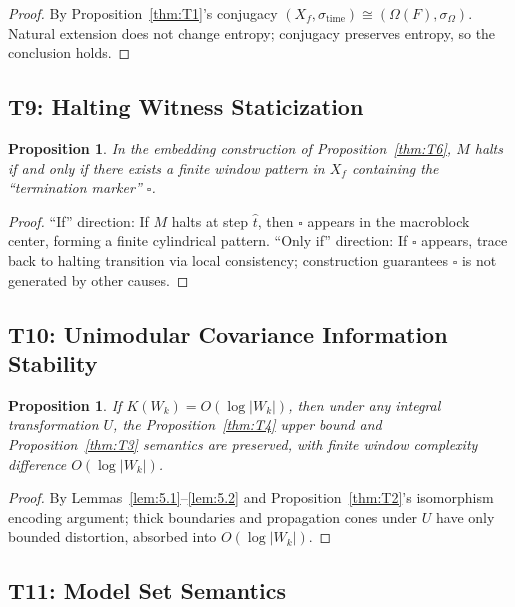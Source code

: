 \documentclass[11pt]{article}
\newtheorem{proposition}[theorem]{Proposition}
\theoremstyle{definition}
\theoremstyle{remark}
\begin{document}
\begin{proof}
By Proposition~\ref{thm:T1}'s conjugacy \( (X_f, \sigma_{\mathrm{time}}) \cong (\Omega(F), \sigma_\Omega) \). Natural extension does not change entropy; conjugacy preserves entropy, so the conclusion holds.
\end{proof}

\subsection{T9: Halting Witness Staticization}

\begin{proposition}\label{thm:T9}
In the embedding construction of Proposition~\ref{thm:T6}, \( M \) halts if and only if there exists a finite window pattern in \( X_f \) containing the ``termination marker'' \( \square \).
\end{proposition}

\begin{proof}
``If'' direction: If \( M \) halts at step \( \hat{t} \), then \( \square \) appears in the macroblock center, forming a finite cylindrical pattern.
``Only if'' direction: If \( \square \) appears, trace back to halting transition via local consistency; construction guarantees \( \square \) is not generated by other causes.
\end{proof}

\subsection{T10: Unimodular Covariance Information Stability}

\begin{proposition}\label{thm:T10}
If \( K(W_k) = O(\log |W_k|) \), then under any integral transformation \( U \), the Proposition~\ref{thm:T4} upper bound and Proposition~\ref{thm:T3} semantics are preserved, with finite window complexity difference \( O(\log |W_k|) \).
\end{proposition}

\begin{proof}
By Lemmas~\ref{lem:5.1}--\ref{lem:5.2} and Proposition~\ref{thm:T2}'s isomorphism encoding argument; thick boundaries and propagation cones under \( U \) have only bounded distortion, absorbed into \( O(\log |W_k|) \).
\end{proof}

\subsection{T11: Model Set Semantics}
\end{document}
